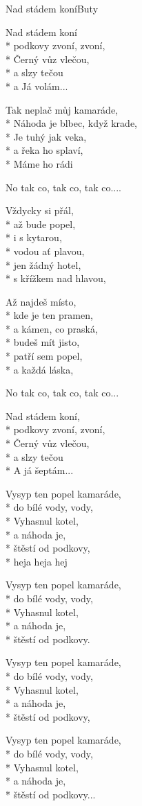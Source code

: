 \documentclass[10.5pt]{book}
\begin{document}
\begin{poem}{Nad stádem koní}{Buty}

\settowidth{\versewidth}{a o všech lidech, co kdy žili na téhle planetě.}

Nad stádem koní\\*
podkovy zvoní, zvoní,\\*
Černý vůz vlečou,\\*
a slzy tečou\\*
a Já volám...

Tak neplač můj kamaráde,\\*
Náhoda je blbec, když krade,\\*
Je tuhý jak veka,\\*
a řeka ho splaví,\\*
Máme ho rádi

No tak co, tak co, tak co....

Vždycky si přál,\\*
až bude popel,\\*
i s kytarou,\\*
vodou ať plavou,\\*
jen žádný hotel,\\*
s křížkem nad hlavou,

Až najdeš místo,\\*
kde je ten pramen,\\*
a kámen, co praská,\\*
budeš mít jisto,\\*
patří sem popel,\\*
a každá láska,

No tak co, tak co, tak co...

Nad stádem koní,\\*
podkovy zvoní, zvoní,\\*
Černý vůz vlečou,\\*
a slzy tečou\\*
A já šeptám...

Vysyp ten popel kamaráde,\\*
do bílé vody, vody,\\*
Vyhasnul kotel,\\*
a náhoda je,\\*
štěstí od podkovy,\\*
heja heja hej

Vysyp ten popel kamaráde,\\*
do bílé vody, vody,\\*
Vyhasnul kotel,\\*
a náhoda je,\\*
štěstí od podkovy.

Vysyp ten popel kamaráde,\\*
do bílé vody, vody,\\*
Vyhasnul kotel,\\*
a náhoda je,\\*
štěstí od podkovy,

Vysyp ten popel kamaráde,\\*
do bílé vody, vody,\\*
Vyhasnul kotel,\\*
a náhoda je,\\*
štěstí od podkovy...

\end{poem}
\end{document}
